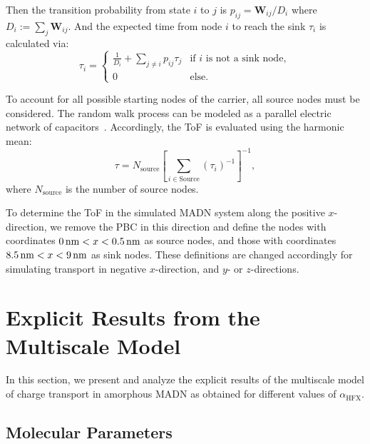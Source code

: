 \documentclass[%
 reprint,
superscriptaddress,
 amsmath,amssymb,
 aps,
prb,
floatfix
]{revtex4-2}
\begin{document}
Then the transition probability from state $i$ to $j$ is $p_{ij} = \mathbf{W}_{ij}/D_i$ where $D_i := \sum_{j} \mathbf{W}_{ij}$.
And the expected time from node $i$ to reach the sink $\tau_i$ is calculated via: 
%
\begin{equation}
  \label{eq:hitting_time}
	\tau_i = \begin{cases}
		\frac{1}{D_i} + \sum_{j \ne i} p_{ij} \tau_{j} &\text{if $i$ is not a sink node},\\
		0 &\text{else.} 
	\end{cases}
\end{equation} 

To account for all possible starting nodes of the carrier, all source nodes must be considered. The random walk process can be modeled as a parallel electric network of capacitors~\cite{doyle_random_1984}. Accordingly, the ToF is evaluated using the harmonic mean:
%
\begin{equation} 
  \tau = N_\text{source} \left[\sum_{i \in \text{Source}} (\tau_i)^{-1}\right]^{-1},
  \label{eq:ToF}
\end{equation}
%
where $N_\text{source}$ is the number of source nodes.

To determine the ToF in the simulated MADN system along the positive $x$-direction, we remove the PBC in this direction and define the nodes with coordinates $\unit[0]{nm} < x < \unit[0.5]{nm}$ as source nodes, and those with coordinates $\unit[8.5]{nm} < x < \unit[9]{nm}$ as sink nodes. These definitions are changed accordingly for simulating transport in negative $x$-direction, and $y$- or $z$-directions.

\section{Explicit Results from the Multiscale Model}
\label{sec:MSMresults}
In this section, we present and analyze the explicit results of the multiscale model of charge transport in amorphous MADN as obtained for different values of $\alpha_\text{HFX}$.



\subsection{Molecular Parameters}
\end{document}
